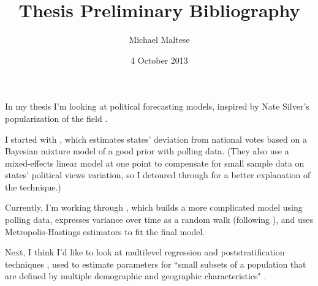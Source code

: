 \documentclass[twoside]{article}
\begin{document}
\title{\textbf{Thesis Preliminary Bibliography}}
\author{Michael Maltese}
\date{4 October 2013}
\maketitle

In my thesis I'm looking at political forecasting models, inspired by Nate Silver's popularization of the field \citeyearpar{signalnoise}.

I started with \citet{bayescombo}, which estimates states' deviation from national votes based on a Bayesian mixture model of a good prior \citep{breadpeace} with polling data. (They also use a mixed-effects linear model at one point to compensate for small sample data on states' political views variation, so I detoured through \citet{multilevelcan} for a better explanation of the technique.)

Currently, I'm working through \citet{strausswalk}, which builds a more complicated model using polling data, expresses variance over time as a random walk (following \citealt{jackman}), and uses Metropolis-Hastings estimators to fit the final model.

Next, I think I'd like to look at multilevel regression and poststratification techniques \citep{deepinteractions,gayrights}, used to estimate parameters for ``small subsets of a population that are defined by multiple demographic and geographic characteristics" \citep{deepinteractions}.

\nocite{*}

\end{document}
